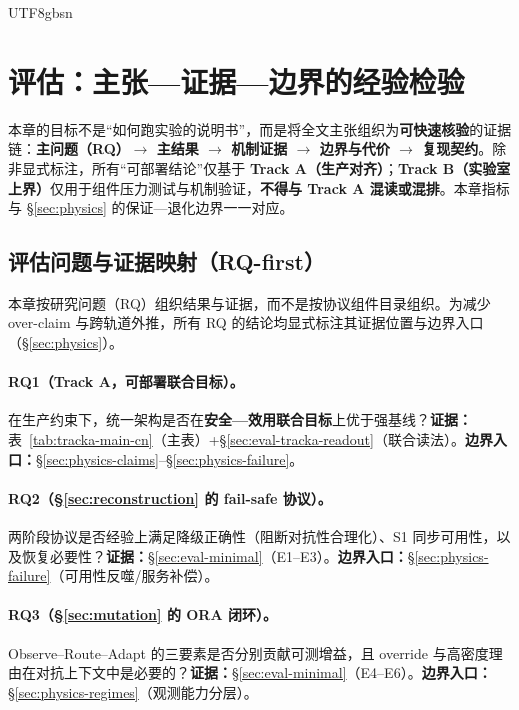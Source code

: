 \documentclass[letterpaper,twocolumn,10pt]{article}
\begin{document}
\begin{CJK}{UTF8}{gbsn}
\section{评估：主张—证据—边界的经验检验}
\label{sec:evaluation}

本章的目标不是“如何跑实验的说明书”，而是将全文主张组织为\textbf{可快速核验}的证据链：\textbf{主问题（RQ）$\to$ 主结果 $\to$ 机制证据 $\to$ 边界与代价 $\to$ 复现契约}。除非显式标注，所有“可部署结论”仅基于 \textbf{Track A（生产对齐）}；\textbf{Track B（实验室上界）}仅用于组件压力测试与机制验证，\textbf{不得与 Track A 混读或混排}。本章指标与 \S\ref{sec:physics} 的保证—退化边界一一对应。

\subsection{评估问题与证据映射（RQ-first）}
\label{sec:eval-scope}

\noindent 本章按研究问题（RQ）组织结果与证据，而不是按协议组件目录组织。为减少 over-claim 与跨轨道外推，所有 RQ 的结论均显式标注其证据位置与边界入口（\S\ref{sec:physics}）。

\paragraph{RQ1（Track A，可部署联合目标）。}
在生产约束下，统一架构是否在\textbf{安全—效用联合目标}上优于强基线？\;\textbf{证据：}表~\ref{tab:tracka-main-cn}（主表）+\S\ref{sec:eval-tracka-readout}（联合读法）。\;\textbf{边界入口：}\S\ref{sec:physics-claims}--\S\ref{sec:physics-failure}。

\paragraph{RQ2（§\ref{sec:reconstruction} 的 fail-safe 协议）。}
两阶段协议是否经验上满足降级正确性（阻断对抗性合理化）、S1 同步可用性，以及恢复必要性？\;\textbf{证据：}\S\ref{sec:eval-minimal}（E1--E3）。\;\textbf{边界入口：}\S\ref{sec:physics-failure}（可用性反噬/服务补偿）。

\paragraph{RQ3（§\ref{sec:mutation} 的 ORA 闭环）。}
Observe--Route--Adapt 的三要素是否分别贡献可测增益，且 override 与高密度理由在对抗上下文中是必要的？\;\textbf{证据：}\S\ref{sec:eval-minimal}（E4--E6）。\;\textbf{边界入口：}\S\ref{sec:physics-regimes}（观测能力分层）。


\end{CJK}
\end{document}
